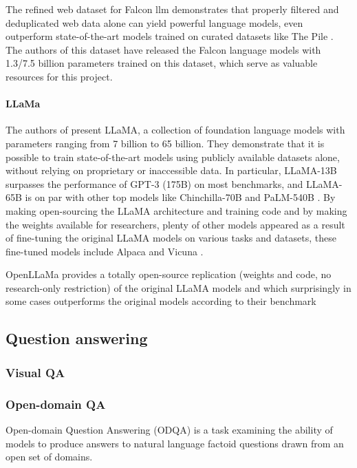 \documentclass[a4paper,12pt]{article}
\begin{document}
The refined web dataset for Falcon llm \cite{falcondataset} demonstrates that properly filtered and deduplicated web data alone can yield powerful language models, 
even outperform state-of-the-art models trained on curated datasets like The Pile \cite{pile}. 
The authors of this dataset\cite{falcondataset} have released the Falcon \cite{falcon} language models with 1.3/7.5 billion parameters trained on this dataset, 
which serve as valuable resources for this project.

\paragraph*{LLaMa}
The authors of \cite{llama} present LLaMA, a collection of foundation language models with parameters ranging from 7 billion to 65 billion. 
They demonstrate that it is possible to train state-of-the-art models using publicly available datasets alone, without relying on proprietary or inaccessible data. 
In particular, LLaMA-13B surpasses the performance of GPT-3 (175B) \cite{gpt3} on most benchmarks, and LLaMA-65B is on par with other top models like Chinchilla-70B \cite{chinchilla} and PaLM-540B \cite{palm}. 
By making open-sourcing the LLaMA architecture and training code and by making the weights available for researchers, plenty of other models appeared as a result of fine-tuning the original LLaMA models on various tasks and datasets, 
these fine-tuned models include Alpaca \cite{alpaca} and Vicuna \cite{vicuna}. 

OpenLLaMa \cite{openllama} provides a totally open-source replication (weights and code, no research-only restriction) of the original LLaMA \cite{llama} models and which surprisingly in some cases outperforms the original models according to their benchmark \cite{openllama}     

\subsection{Question answering}
\subsubsection{Visual QA}
\subsubsection{Open-domain QA}
Open-domain Question Answering (ODQA) is a
task examining the ability of models to produce answers to natural language factoid questions drawn
from an open set of domains.
\end{document}
